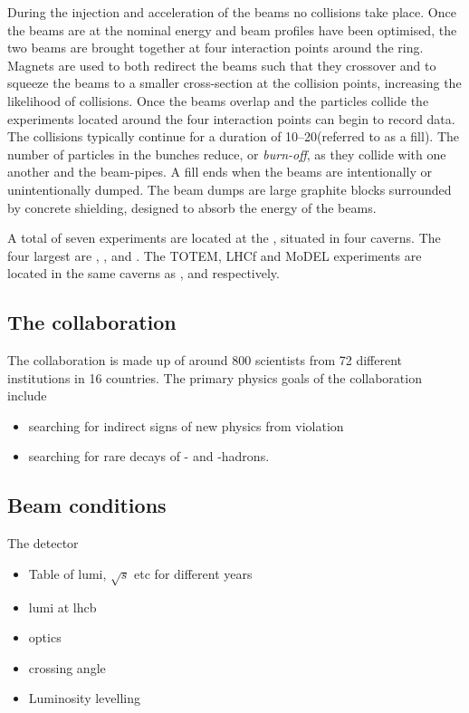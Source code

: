 During the injection and acceleration of the beams no collisions take place. Once the beams are at the nominal energy and beam profiles have been optimised, the two beams are brought together at four interaction points around the ring. Magnets are used to both redirect the beams such that they crossover and to squeeze the beams to a smaller cross-section at the collision points, increasing the likelihood of collisions. Once the beams overlap and the particles collide the experiments located around the four interaction points can begin to record data. The collisions typically continue for a duration of 10--20\hr (referred to as a fill). The number of particles in the bunches reduce, or \emph{burn-off}, as they collide with one another and the beam-pipes. A fill ends when the beams are intentionally or unintentionally dumped. The beam dumps are large graphite blocks surrounded by concrete shielding, designed to absorb the energy of the beams.  

A total of seven experiments are located at the \lhc, situated in four caverns. The four largest are \atlas, \cms, \lhcb and \alice. The TOTEM, LHCf and MoDEL experiments are located in the same caverns as \cms, \atlas and \lhcb respectively. 


\subsection{The \lhcb collaboration} 

The \lhcb collaboration is made up of around 800 scientists from 72 different institutions in 16 countries. The primary physics goals of the collaboration include
\begin{itemize}
\item searching for indirect signs of new physics from \CP violation
\item searching for rare decays of \bquark- and \cquark-hadrons. 
\end{itemize}  



\subsection{Beam conditions}


The \lhcb detector 


{\color{Red}
\begin{itemize}
\item Table of lumi, $\sqrt{s}$ etc for different years
\item lumi at lhcb
\item \lhc optics
\item crossing angle
\item Luminosity levelling
\end{itemize}
}


